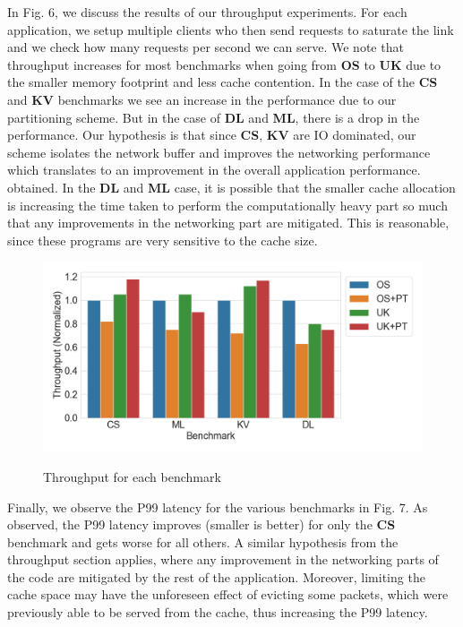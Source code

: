 \documentclass[sigconf,authorversion,noacm]{acmart}
\begin{document}
In Fig. 6, we discuss the results of our throughput experiments. For each
application, we setup multiple clients who then send requests to saturate the
link and we check how many requests per second we can serve. We note that
throughput increases for most benchmarks when going from \textbf{OS} to
\textbf{UK} due to the smaller memory footprint and less cache contention. In
the case of the \textbf{CS} and \textbf{KV} benchmarks we see an increase in the
performance due to our partitioning scheme. But in the case of \textbf{DL} and
\textbf{ML}, there is a drop in the performance. Our hypothesis is that since
\textbf{CS}, \textbf{KV} are IO dominated, our scheme isolates the network
buffer and improves the networking performance which translates to an
improvement in the overall application performance. obtained. In the \textbf{DL}
and \textbf{ML} case, it is possible that the smaller cache allocation is
increasing the time taken to perform the computationally heavy part so much that
any improvements in the networking part are mitigated. This is reasonable,
since these programs are very sensitive to the cache size.

\begin{figure}[h]
  \centering
  \includegraphics[width=\linewidth]{res3}
    \label{fig:motivating}
    \vspace{-2em}
    \caption{Throughput for each benchmark}
\end{figure}

Finally, we observe the P99 latency for the various benchmarks in Fig. 7. As
observed, the P99 latency improves (smaller is better) for only the \textbf{CS}
benchmark and gets worse for all others. A similar hypothesis from the
throughput section applies, where any improvement in the networking parts of the
code are mitigated by the rest of the application. Moreover, limiting the cache
space may have the unforeseen effect of evicting some packets, which were
previously able to be served from the cache, thus increasing the P99 latency.
\end{document}
